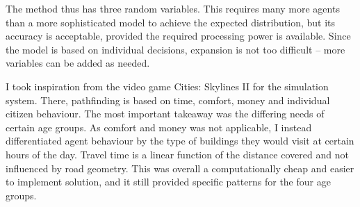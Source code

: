 The method thus has three random variables. This requires many more agents than a more sophisticated model to achieve the expected distribution, but its accuracy is acceptable, provided the required processing power is available. Since the model is based on individual decisions, expansion is not too difficult -- more variables can be added as needed. 

I took inspiration from the video game Cities: Skylines II for the simulation system. There, pathfinding is based on time, comfort, money and individual citizen behaviour.\cite{CSII-traffic} The most important takeaway was the differing needs of certain age groups. As comfort and money was not applicable, I instead differentiated agent behaviour by the type of buildings they would visit at certain hours of the day. Travel time is a linear function of the distance covered and not influenced by road geometry. This was overall a computationally cheap and easier to implement solution, and it still provided specific patterns for the four age groups.